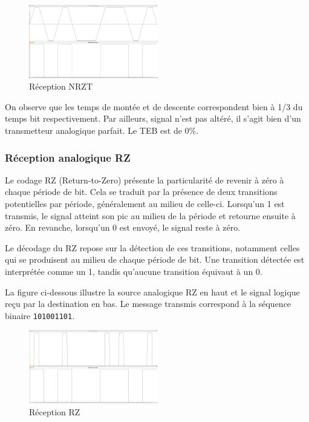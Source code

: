 \begin{figure}[H]
    \centering
    \includegraphics[width=0.5\textwidth]{img/etape2_reception_NRZT.png}
    \caption{Réception NRZT}
    \label{fig:teb1}
\end{figure}

On observe que les temps de montée et de descente correspondent bien à 1/3 du temps bit respectivement. Par ailleurs, signal n'est pas altéré, il s'agit bien d'un transmetteur analogique parfait. Le TEB est de 0\%.

\subsubsection{Réception analogique RZ}

Le codage RZ (Return-to-Zero) présente la particularité de revenir à zéro à chaque période de bit. Cela se traduit par la présence de deux transitions potentielles par période, généralement au milieu de celle-ci. Lorsqu'un 1 est transmis, le signal atteint son pic au milieu de la période et retourne ensuite à zéro. En revanche, lorsqu'un 0 est envoyé, le signal reste à zéro.

Le décodage du RZ repose sur la détection de ces transitions, notamment celles qui se produisent au milieu de chaque période de bit. Une transition détectée est interprétée comme un 1, tandis qu'aucune transition équivaut à un 0. 

La figure ci-dessous illustre la source analogique RZ en haut et le signal logique reçu par la destination en bas. Le message transmis correspond à la séquence binaire \texttt{101001101}.

\begin{figure}[H]
    \centering
    \includegraphics[width=0.5\textwidth]{img/etape2_reception_RZ.png}
    \caption{Réception RZ}
    \label{fig:teb1}
\end{figure}

